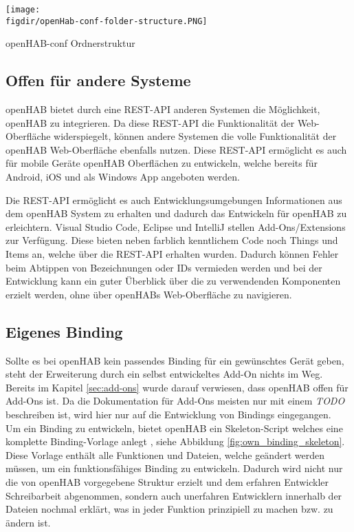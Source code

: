 \smallskip
{
	\centering
	\captionsetup{type=figure}
	\texttt{[image: \\figdir/openHab-conf-folder-structure.PNG]}
	\caption{openHAB-conf Ordnerstruktur \label{fig:openHAB-conf-folder-structure}}
}

\subsection{Offen für andere Systeme}
openHAB bietet durch eine REST-API anderen Systemen die Möglichkeit, openHAB zu integrieren. Da diese REST-API die Funktionalität der Web-Oberfläche widerspiegelt, können andere Systemen die volle Funktionalität der openHAB Web-Oberfläche ebenfalls nutzen. Diese REST-API ermöglicht es auch für mobile Geräte openHAB Oberflächen zu entwickeln, welche bereits für Android, iOS und als Windows App angeboten werden.

Die REST-API ermöglicht es auch Entwicklungsumgebungen Informationen aus dem openHAB System zu erhalten und dadurch das Entwickeln für openHAB zu erleichtern. Visual Studio Code, Eclipse und IntelliJ stellen Add-Ons/Extensions zur Verfügung. Diese bieten neben farblich kenntlichem Code noch Things und Items an, welche über die REST-API erhalten wurden. Dadurch können Fehler beim Abtippen von Bezeichnungen oder IDs vermieden werden und bei der Entwicklung kann ein guter Überblick über die zu verwendenden Komponenten erzielt werden, ohne über openHABs Web-Oberfläche zu navigieren.

\subsection{Eigenes Binding}
Sollte es bei openHAB kein passendes Binding für ein gewünschtes Gerät geben, steht der Erweiterung durch ein selbst entwickeltes Add-On nichts im Weg. Bereits im Kapitel \ref{sec:add-ons} wurde darauf verwiesen, dass openHAB offen für Add-Ons ist. Da die Dokumentation für Add-Ons meisten nur mit einem \textit{TODO} beschreiben ist, wird hier nur auf die Entwicklung von Bindings eingegangen.\\
Um ein Binding zu entwickeln, bietet openHAB ein Skeleton-Script welches eine komplette Binding-Vorlage anlegt \cite{openHAB05:OH}, siehe Abbildung \ref{fig:own_binding_skeleton}. Diese Vorlage enthält alle Funktionen und Dateien, welche geändert werden müssen, um ein funktionsfähiges Binding zu entwickeln. Dadurch wird nicht nur die von openHAB vorgegebene Struktur erzielt und dem erfahren Entwickler Schreibarbeit abgenommen, sondern auch unerfahren Entwicklern innerhalb der Dateien nochmal erklärt, was in jeder Funktion prinzipiell zu machen bzw. zu ändern ist.

